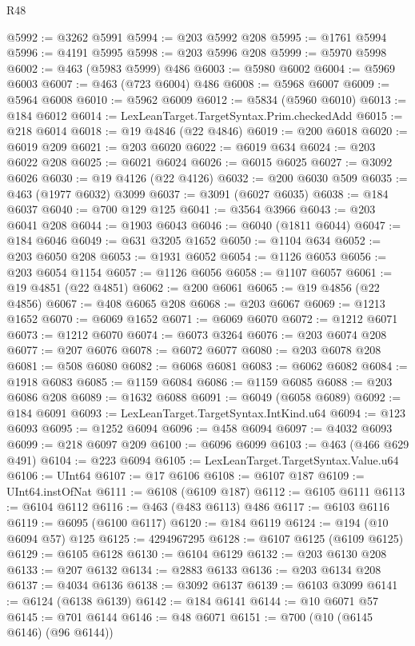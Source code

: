 \begin{lexlean}{R48}
\begin{coremodule}
@5992 := @3262 @5991
@5994 := @203 @5992 @208
@5995 := @1761 @5994
@5996 := @4191 @5995
@5998 := @203 @5996 @208
@5999 := @5970 @5998
@6002 := @463 (@5983 @5999) @486
@6003 := @5980 @6002
@6004 := @5969 @6003
@6007 := @463 (@723 @6004) @486
@6008 := @5968 @6007
@6009 := @5964 @6008
@6010 := @5962 @6009
@6012 := @5834 (@5960 @6010)
@6013 := @184 @6012
@6014 := LexLeanTarget.TargetSyntax.Prim.checkedAdd
@6015 := @218 @6014
@6018 := @19 @4846 (@22 @4846)
@6019 := @200 @6018
@6020 := @6019 @209
@6021 := @203 @6020
@6022 := @6019 @634
@6024 := @203 @6022 @208
@6025 := @6021 @6024
@6026 := @6015 @6025
@6027 := @3092 @6026
@6030 := @19 @4126 (@22 @4126)
@6032 := @200 @6030 @509
@6035 := @463 (@1977 @6032) @3099
@6037 := @3091 (@6027 @6035)
@6038 := @184 @6037
@6040 := @700 @129 @125
@6041 := @3564 @3966
@6043 := @203 @6041 @208
@6044 := @1903 @6043
@6046 := @6040 (@1811 @6044)
@6047 := @184 @6046
@6049 := @631 @3205 @1652
@6050 := @1104 @634
@6052 := @203 @6050 @208
@6053 := @1931 @6052
@6054 := @1126 @6053
@6056 := @203 @6054 @1154
@6057 := @1126 @6056
@6058 := @1107 @6057
@6061 := @19 @4851 (@22 @4851)
@6062 := @200 @6061
@6065 := @19 @4856 (@22 @4856)
@6067 := @408 @6065 @208
@6068 := @203 @6067
@6069 := @1213 @1652
@6070 := @6069 @1652
@6071 := @6069 @6070
@6072 := @1212 @6071
@6073 := @1212 @6070
@6074 := @6073 @3264
@6076 := @203 @6074 @208
@6077 := @207 @6076
@6078 := @6072 @6077
@6080 := @203 @6078 @208
@6081 := @508 @6080
@6082 := @6068 @6081
@6083 := @6062 @6082
@6084 := @1918 @6083
@6085 := @1159 @6084
@6086 := @1159 @6085
@6088 := @203 @6086 @208
@6089 := @1632 @6088
@6091 := @6049 (@6058 @6089)
@6092 := @184 @6091
@6093 := LexLeanTarget.TargetSyntax.IntKind.u64
@6094 := @123 @6093
@6095 := @1252 @6094
@6096 := @458 @6094
@6097 := @4032 @6093
@6099 := @218 @6097 @209
@6100 := @6096 @6099
@6103 := @463 (@466 @629 @491)
@6104 := @223 @6094
@6105 := LexLeanTarget.TargetSyntax.Value.u64
@6106 := UInt64
@6107 := @17 @6106
@6108 := @6107 @187
@6109 := UInt64.instOfNat
@6111 := @6108 (@6109 @187)
@6112 := @6105 @6111
@6113 := @6104 @6112
@6116 := @463 (@483 @6113) @486
@6117 := @6103 @6116
@6119 := @6095 (@6100 @6117)
@6120 := @184 @6119
@6124 := @194 (@10 @6094 @57) @125
@6125 := 4294967295
@6128 := @6107 @6125 (@6109 @6125)
@6129 := @6105 @6128
@6130 := @6104 @6129
@6132 := @203 @6130 @208
@6133 := @207 @6132
@6134 := @2883 @6133
@6136 := @203 @6134 @208
@6137 := @4034 @6136
@6138 := @3092 @6137
@6139 := @6103 @3099
@6141 := @6124 (@6138 @6139)
@6142 := @184 @6141
@6144 := @10 @6071 @57
@6145 := @701 @6144
@6146 := @48 @6071
@6151 := @700 (@10 (@6145 @6146) (@96 @6144))

\end{coremodule}
\end{lexlean}
